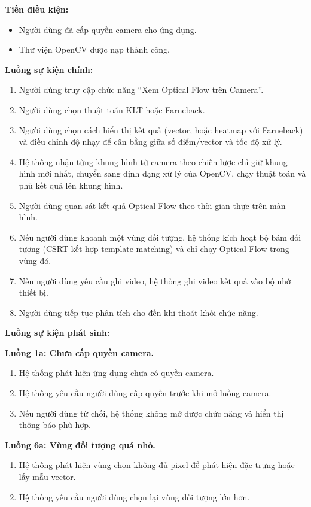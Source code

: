 \documentclass[../DoAn.tex]{subfiles}
\begin{document}
\textbf{Tiền điều kiện:}
\begin{itemize}
    \item Người dùng đã cấp quyền camera cho ứng dụng.
    \item Thư viện OpenCV được nạp thành công.
\end{itemize}

\textbf{Luồng sự kiện chính:}
\begin{enumerate}
    \item Người dùng truy cập chức năng ``Xem Optical Flow trên Camera''.
    \item Người dùng chọn thuật toán KLT hoặc Farneback.
    \item Người dùng chọn cách hiển thị kết quả (vector, hoặc heatmap với Farneback) và điều chỉnh độ nhạy để cân bằng giữa số điểm/vector và tốc độ xử lý.
    \item Hệ thống nhận từng khung hình từ camera theo chiến lược chỉ giữ khung hình mới nhất, chuyển sang định dạng xử lý của OpenCV, chạy thuật toán và phủ kết quả lên khung hình.
    \item Người dùng quan sát kết quả Optical Flow theo thời gian thực trên màn hình.
    \item Nếu người dùng khoanh một vùng đối tượng, hệ thống kích hoạt bộ bám đối tượng (CSRT kết hợp template matching) và chỉ chạy Optical Flow trong vùng đó.
    \item Nếu người dùng yêu cầu ghi video, hệ thống ghi video kết quả vào bộ nhớ thiết bị.
    \item Người dùng tiếp tục phân tích cho đến khi thoát khỏi chức năng.
\end{enumerate}

\textbf{Luồng sự kiện phát sinh:}

\textbf{Luồng 1a: Chưa cấp quyền camera.}
\begin{enumerate}[label=1a.\arabic*., leftmargin=2.6em, align=left, labelsep=0.5em]
    \item Hệ thống phát hiện ứng dụng chưa có quyền camera.
    \item Hệ thống yêu cầu người dùng cấp quyền trước khi mở luồng camera.
    \item Nếu người dùng từ chối, hệ thống không mở được chức năng và hiển thị thông báo phù hợp.
\end{enumerate}

\textbf{Luồng 6a: Vùng đối tượng quá nhỏ.}
\begin{enumerate}[label=6a.\arabic*., leftmargin=2.6em, align=left, labelsep=0.5em]
    \item Hệ thống phát hiện vùng chọn không đủ pixel để phát hiện đặc trưng hoặc lấy mẫu vector.
    \item Hệ thống yêu cầu người dùng chọn lại vùng đối tượng lớn hơn.
\end{enumerate}
\end{document}
